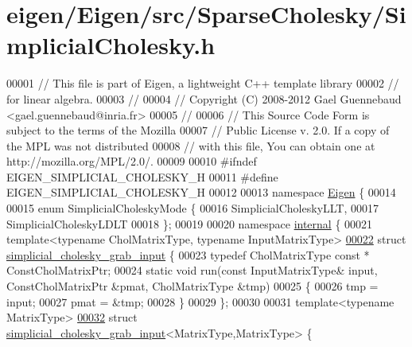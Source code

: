 \hypertarget{eigen_2_eigen_2src_2_sparse_cholesky_2_simplicial_cholesky_8h_source}{}\section{eigen/\+Eigen/src/\+Sparse\+Cholesky/\+Simplicial\+Cholesky.h}
\label{eigen_2_eigen_2src_2_sparse_cholesky_2_simplicial_cholesky_8h_source}

\begin{DoxyCode}
00001 \textcolor{comment}{// This file is part of Eigen, a lightweight C++ template library}
00002 \textcolor{comment}{// for linear algebra.}
00003 \textcolor{comment}{//}
00004 \textcolor{comment}{// Copyright (C) 2008-2012 Gael Guennebaud <gael.guennebaud@inria.fr>}
00005 \textcolor{comment}{//}
00006 \textcolor{comment}{// This Source Code Form is subject to the terms of the Mozilla}
00007 \textcolor{comment}{// Public License v. 2.0. If a copy of the MPL was not distributed}
00008 \textcolor{comment}{// with this file, You can obtain one at http://mozilla.org/MPL/2.0/.}
00009 
00010 \textcolor{preprocessor}{#ifndef EIGEN\_SIMPLICIAL\_CHOLESKY\_H}
00011 \textcolor{preprocessor}{#define EIGEN\_SIMPLICIAL\_CHOLESKY\_H}
00012 
00013 \textcolor{keyword}{namespace }\hyperlink{namespace_eigen}{Eigen} \{ 
00014 
00015 \textcolor{keyword}{enum} SimplicialCholeskyMode \{
00016   SimplicialCholeskyLLT,
00017   SimplicialCholeskyLDLT
00018 \};
00019 
00020 \textcolor{keyword}{namespace }\hyperlink{namespaceinternal}{internal} \{
00021   \textcolor{keyword}{template}<\textcolor{keyword}{typename} CholMatrixType, \textcolor{keyword}{typename} InputMatrixType>
\hyperlink{struct_eigen_1_1internal_1_1simplicial__cholesky__grab__input}{00022}   \textcolor{keyword}{struct }\hyperlink{struct_eigen_1_1internal_1_1simplicial__cholesky__grab__input}{simplicial\_cholesky\_grab\_input} \{
00023     \textcolor{keyword}{typedef} CholMatrixType \textcolor{keyword}{const} * ConstCholMatrixPtr;
00024     \textcolor{keyword}{static} \textcolor{keywordtype}{void} run(\textcolor{keyword}{const} InputMatrixType& input, ConstCholMatrixPtr &pmat, CholMatrixType &tmp)
00025     \{
00026       tmp = input;
00027       pmat = &tmp;
00028     \}
00029   \};
00030   
00031   \textcolor{keyword}{template}<\textcolor{keyword}{typename} MatrixType>
\hyperlink{struct_eigen_1_1internal_1_1simplicial__cholesky__grab__input_3_01_matrix_type_00_01_matrix_type_01_4}{00032}   \textcolor{keyword}{struct }\hyperlink{struct_eigen_1_1internal_1_1simplicial__cholesky__grab__input}{simplicial\_cholesky\_grab\_input}<MatrixType,MatrixType> \{

\end{DoxyCode}
